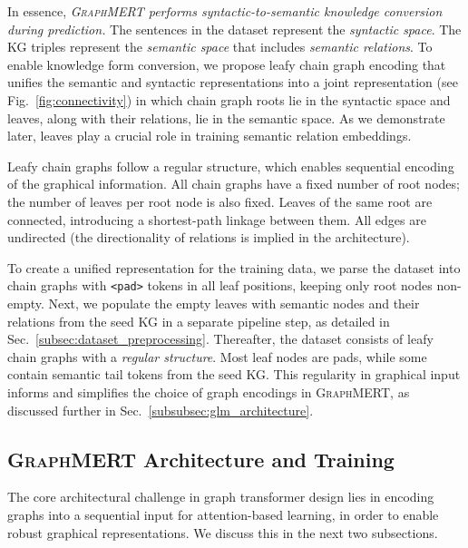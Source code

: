 \documentclass[10pt]{article}
\newcommand{\ours}{\textsc{GraphMERT}\xspace}
\begin{document}
In essence, \textit{\ours performs syntactic-to-semantic knowledge conversion during prediction.} The sentences in the dataset represent the \emph{syntactic space}. The KG triples represent the \emph{semantic space} that includes \emph{semantic relations}. To enable knowledge form conversion, we propose leafy chain graph encoding that unifies the semantic and syntactic representations into a joint representation (see Fig.~\ref{fig:connectivity}) in which chain graph roots lie in the syntactic space and leaves, along with their relations, lie in the semantic space. As we demonstrate later, leaves play a crucial role in training semantic relation embeddings. 

Leafy chain graphs follow a regular structure, which enables sequential encoding of the graphical information. All chain graphs have a fixed number of root nodes; the number of leaves per root node is also fixed. Leaves of the same root are connected, introducing a shortest-path linkage between them. All edges are undirected (the directionality of relations is implied in the architecture).

To create a unified representation for the training data, we parse the dataset into chain graphs with \texttt{<pad>} tokens in all leaf positions, keeping only root nodes non-empty. Next, we populate the empty leaves with semantic nodes and their relations from the seed KG in a separate pipeline step, as detailed in Sec.~\ref{subsec:dataset_preprocessing}. Thereafter, the dataset consists of leafy chain graphs with a \emph{regular structure}. Most leaf nodes are pads, while some contain semantic tail tokens from the seed KG. This regularity in graphical input informs and simplifies the choice of graph encodings in \ours, as discussed further in Sec.~\ref{subsubsec:glm_architecture}.

\subsection{\ours Architecture and Training}
\label{subsec:glm_architecture_and_training}

The core architectural challenge in graph transformer design lies in encoding graphs into a sequential input for attention-based learning, in order to enable robust graphical representations. We discuss this in the next two subsections.
\end{document}
